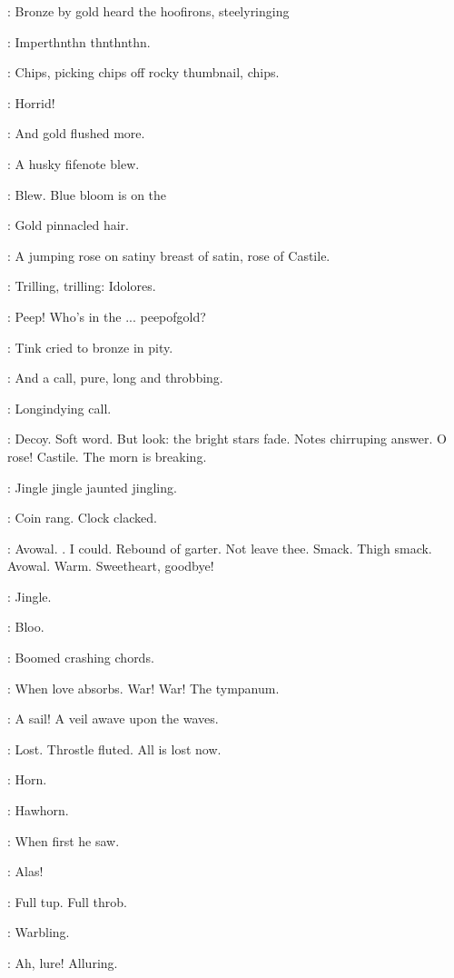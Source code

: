 
:
Bronze by gold heard the hoofirons, steelyringing

\boots:
Imperthnthn thnthnthn.

\simon:
Chips,
picking chips off rocky thumbnail,
chips.

\MissK:
Horrid!

:
And gold flushed more.

:
A husky fifenote blew.

\BloomInt:
Blew.
Blue bloom is on the

:
Gold pinnacled hair.

\BloomInt:
A jumping rose on satiny breast of satin,
rose of Castile.

\MissD:
Trilling, trilling:
Idolores.

\lenehan:
Peep!
Who's in the ...
peepofgold?

:
Tink cried to bronze in pity.

:
And a call,
pure, long and throbbing.

\BloomInt:
Longindying call.

\BloomInt:
Decoy.
Soft word.
But look:
the bright stars fade.
Notes chirruping answer.
O rose!
Castile.
The morn is breaking.

\boylan:
Jingle jingle jaunted jingling.

\BloomInt:
Coin rang.
Clock clacked.

\lenehan:
Avowal.
.
I could.
Rebound of garter.
Not leave thee.
Smack.
Thigh smack.
Avowal.
Warm.
Sweetheart, goodbye!

\boylan:
Jingle.

\BloomInt:
Bloo.

:
Boomed crashing chords.

\BloomInt:
When love absorbs.
War!
War!
The tympanum.

\BloomInt:
A sail!
A veil awave upon the waves.

\BloomInt:
Lost.
Throstle fluted.
All is lost now.

\BloomInt:
Horn.

:
Hawhorn.

:
When first he saw.

\BloomInt:
Alas!

\BloomInt:
Full tup.
Full throb.

:
Warbling.

\BloomInt:
Ah, lure!
Alluring.

